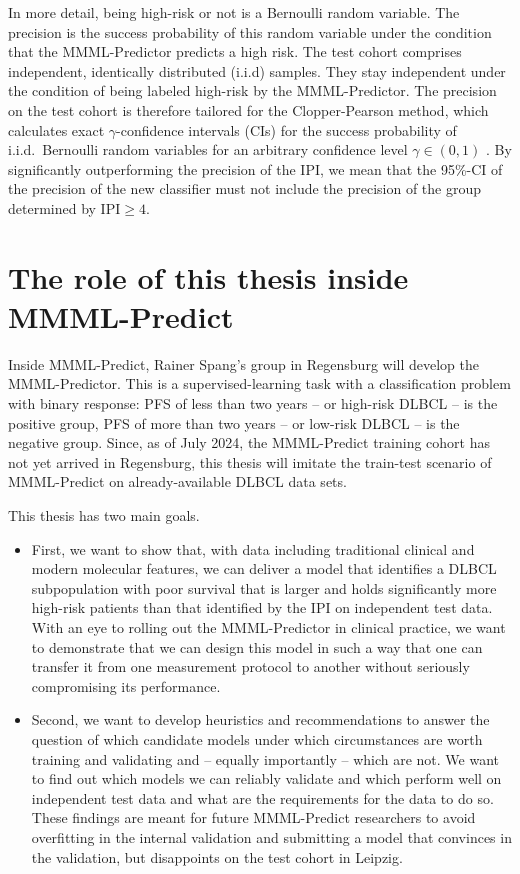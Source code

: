 In more detail, being high-risk or not is a Bernoulli random variable. 
The precision is the success probability of this random variable under the condition that the 
MMML-Predictor predicts a high risk. The test cohort comprises independent, identically distributed 
(i.i.d) samples. They stay independent under the condition of being labeled high-risk by the 
MMML-Predictor. The precision on the test cohort is therefore tailored for the Clopper-Pearson 
method, which calculates exact $\gamma$-confidence intervals (CIs) for the success probability 
of i.i.d.\ Bernoulli random variables for an arbitrary confidence level $\gamma \in (0, 1)$
\cite{clopper34}.
By significantly outperforming the precision of the IPI, we mean that the \num{95}\%-CI
of the precision of the new classifier must not include the 
precision of the group determined by $\text{IPI} \geq 4$.

\section{The role of this thesis inside MMML-Predict}

Inside MMML-Predict, Rainer Spang's group in Regensburg will develop the MMML-Predictor. 
This is 
a supervised-learning task with a classification problem with binary response: PFS of less 
than two years -- or high-risk DLBCL -- is the positive group, PFS of more than two 
years -- or low-risk DLBCL -- is the negative group. Since, as of July 2024, the MMML-Predict 
training cohort has not yet arrived in Regensburg, this thesis will imitate the train-test scenario 
of MMML-Predict on already-available DLBCL data sets. 

This thesis has two main goals.
\begin{itemize}
\item First, we want to show that, with data including traditional clinical and modern 
molecular features, we can deliver a model that identifies a DLBCL subpopulation with poor survival 
that is larger and holds significantly more high-risk patients than that identified by the IPI on 
independent test data. 
With an eye to rolling out the MMML-Predictor in clinical practice, 
we want to demonstrate that we can design this model in such a way that one can transfer it from 
one measurement protocol to another without seriously compromising its performance.
\item Second, we want to develop heuristics and recommendations to answer the question of which 
candidate models under which circumstances are worth training and validating and -- equally 
importantly -- which are not. We want to find out which models we can reliably validate and which 
perform well on independent test data and what are the requirements for the data to do so. These 
findings are meant for future MMML-Predict researchers to avoid 
overfitting in the internal validation and submitting a model that convinces 
in the validation, but disappoints on the test cohort in Leipzig.
\end{itemize}